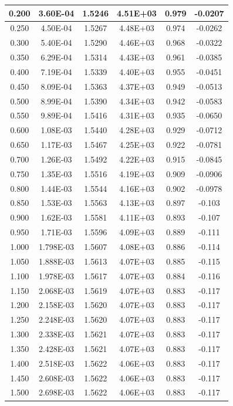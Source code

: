 \documentclass[UTF8,10pt,a4paper]{article}
\begin{document}
\begin{table}[h]
\begin{tabular}{|c|c|c|c|c|c|}
    0.200 & 3.60E-04 & 1.5246 & 4.51E+03 & 0.979 & -0.0207 \\ \hline
    0.250 & 4.50E-04 & 1.5267 & 4.48E+03 & 0.974 & -0.0262 \\ \hline
    0.300 & 5.40E-04 & 1.5290 & 4.46E+03 & 0.968 & -0.0322 \\ \hline
    0.350 & 6.29E-04 & 1.5314 & 4.43E+03 & 0.961 & -0.0385 \\ \hline
    0.400 & 7.19E-04 & 1.5339 & 4.40E+03 & 0.955 & -0.0451 \\ \hline
    0.450 & 8.09E-04 & 1.5363 & 4.37E+03 & 0.949 & -0.0513 \\ \hline
    0.500 & 8.99E-04 & 1.5390 & 4.34E+03 & 0.942 & -0.0583 \\ \hline
    0.550 & 9.89E-04 & 1.5416 & 4.31E+03 & 0.935 & -0.0650 \\ \hline
    0.600 & 1.08E-03 & 1.5440 & 4.28E+03 & 0.929 & -0.0712 \\ \hline
    0.650 & 1.17E-03 & 1.5467 & 4.25E+03 & 0.922 & -0.0781 \\ \hline
    0.700 & 1.26E-03 & 1.5492 & 4.22E+03 & 0.915 & -0.0845 \\ \hline
    0.750 & 1.35E-03 & 1.5516 & 4.19E+03 & 0.909 & -0.0906 \\ \hline
    0.800 & 1.44E-03 & 1.5544 & 4.16E+03 & 0.902 & -0.0978 \\ \hline
    0.850 & 1.53E-03 & 1.5563 & 4.13E+03 & 0.897 & -0.103 \\ \hline
    0.900 & 1.62E-03 & 1.5581 & 4.11E+03 & 0.893 & -0.107 \\ \hline
    0.950 & 1.71E-03 & 1.5596 & 4.09E+03 & 0.889 & -0.111 \\ \hline
    1.000 & 1.798E-03 & 1.5607 & 4.08E+03 & 0.886 & -0.114 \\ \hline
    1.050 & 1.888E-03 & 1.5613 & 4.07E+03 & 0.885 & -0.115 \\ \hline
    1.100 & 1.978E-03 & 1.5617 & 4.07E+03 & 0.884 & -0.116 \\ \hline
    1.150 & 2.068E-03 & 1.5619 & 4.07E+03 & 0.883 & -0.117 \\ \hline
    1.200 & 2.158E-03 & 1.5620 & 4.07E+03 & 0.883 & -0.117 \\ \hline
    1.250 & 2.248E-03 & 1.5620 & 4.07E+03 & 0.883 & -0.117 \\ \hline
    1.300 & 2.338E-03 & 1.5621 & 4.07E+03 & 0.883 & -0.117 \\ \hline
    1.350 & 2.428E-03 & 1.5621 & 4.07E+03 & 0.883 & -0.117 \\ \hline
    1.400 & 2.518E-03 & 1.5622 & 4.06E+03 & 0.883 & -0.117 \\ \hline
    1.450 & 2.608E-03 & 1.5622 & 4.06E+03 & 0.883 & -0.117 \\ \hline
    1.500 & 2.698E-03 & 1.5622 & 4.06E+03 & 0.883 & -0.117 \\ \hline
    \end{tabular}
    \normalsize
\end{table}
\end{document}
